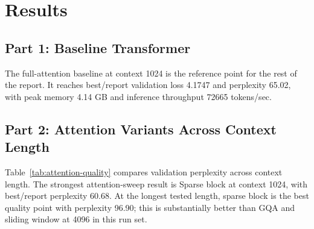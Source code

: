 \documentclass[11pt]{article}
\begin{document}
\section{Results}
\subsection{Part 1: Baseline Transformer}
The full-attention baseline at context 1024 is the reference point for the rest of the report. It reaches best/report validation loss 4.1747 and perplexity 65.02, with peak memory 4.14 GB and inference throughput 72665 tokens/sec.

\begin{table}[H]
\centering
\small
\caption{Baseline Transformer metrics.}
\label{tab:baseline}
\end{table}

\subsection{Part 2: Attention Variants Across Context Length}
Table~\ref{tab:attention-quality} compares validation perplexity across context length. The strongest attention-sweep result is Sparse block at context 1024, with best/report perplexity 60.68. At the longest tested length, sparse block is the best quality point with perplexity 96.90; this is substantially better than GQA and sliding window at 4096 in this run set.

\begin{table}[H]
\centering
\small
\caption{Attention validation perplexity across context length. Lower is better.}
\label{tab:attention-quality}
\end{table}
\end{document}

